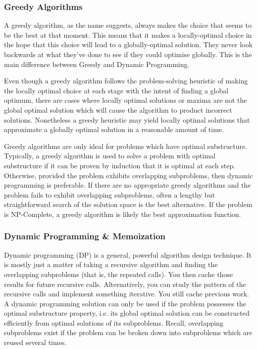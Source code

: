 \documentclass{article}
\begin{document}
    \subsubsection{Greedy Algorithms}
    A greedy algorithm, as the name suggests, always makes the choice that seems to be the best at that moment. This means that it makes a locally-optimal choice in the hope that this choice will lead to a globally-optimal solution. They never look backwards at what they’ve done to see if they could optimise globally. This is the main difference between Greedy and Dynamic Programming.

    Even though a greedy algorithm follows the problem-solving heuristic of making the locally optimal choice at each stage with the intent of finding a global optimum, there are cases where locally optimal solutions or maxima are not the global optimal solution which will cause the algorithm to product incorrect solutions. Nonetheless a greedy heuristic may yield locally optimal solutions that approximate a globally optimal solution in a reasonable amount of time.
    
    Greedy algorithms are only ideal for problems which have optimal substructure. Typically, a greedy algorithm is used to solve a problem with optimal substructure if it can be proven by induction that it is optimal at each step. Otherwise, provided the problem exhibits overlapping subproblems, then dynamic programming is preferable. If there are no appropriate greedy algorithms and the problem fails to exhibit overlapping subproblems, often a lengthy but straightforward search of the solution space is the best alternative. If the problem is NP-Complete, a greedy algorithm is likely the best approximation function.
    
    
    \subsubsection{Dynamic Programming \& Memoization}
    Dynamic programming (DP) is a general, powerful algorithm design technique. It is mostly just a matter of taking a recursive algorithm and finding the overlapping subproblems (that is, the repeated calls). You then cache those results for future recursive calls. Alternatively, you can study the pattern of the recursive calls and implement something iterative. You still cache previous work. A dynamic programming solution can only be used if the problem possesses the optimal substructure property, i.e. its global optimal solution can be constructed efficiently from optimal solutions of its subproblems. Recall, overlapping subproblems exist if the problem can be broken down into subproblems which are reused several times. 
    
\end{document}
